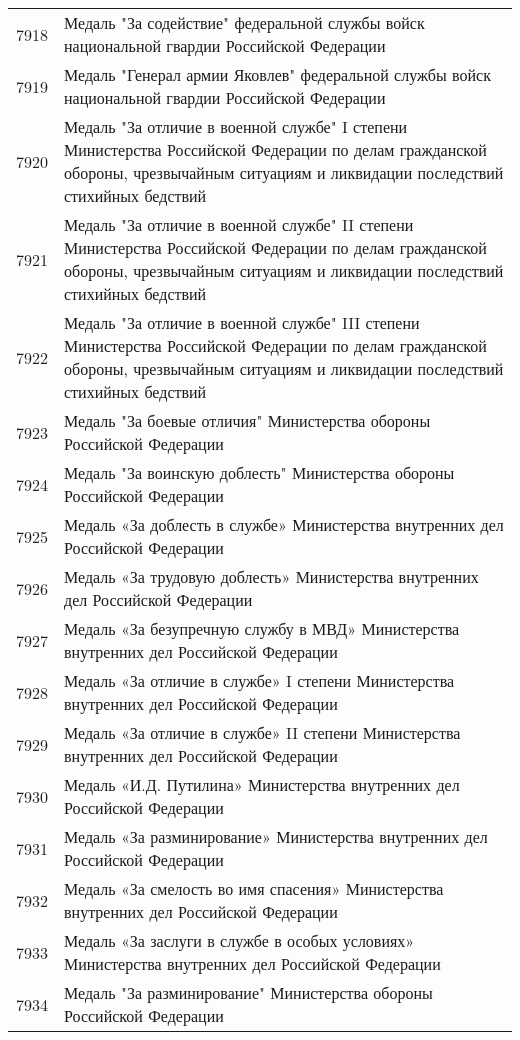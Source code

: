\documentclass[10pt, a4paper, titlepage]{article}
\begin{document}
\begin{center}
\begin{longtable}{rp{}}
        7918 & Медаль "За содействие" федеральной службы войск национальной гвардии Российской Федерации \\
        7919 & Медаль "Генерал армии Яковлев" федеральной службы войск национальной гвардии Российской Федерации \\
        7920 & Медаль "За отличие в военной службе" I степени Министерства Российской Федерации по делам гражданской обороны, чрезвычайным ситуациям и ликвидации последствий стихийных бедствий \\
        7921 & Медаль "За отличие в военной службе" II степени Министерства Российской Федерации по делам гражданской обороны, чрезвычайным ситуациям и ликвидации последствий стихийных бедствий \\
        7922 & Медаль "За отличие в военной службе" III степени Министерства Российской Федерации по делам гражданской обороны, чрезвычайным ситуациям и ликвидации последствий стихийных бедствий \\
        7923 & Медаль "За боевые отличия" Министерства обороны Российской Федерации \\
        7924 & Медаль "За воинскую доблесть" Министерства обороны Российской Федерации \\
        7925 & Медаль «За доблесть в службе» Министерства внутренних дел Российской Федерации \\
        7926 & Медаль «За трудовую доблесть» Министерства внутренних дел Российской Федерации \\
        7927 & Медаль «За безупречную службу в МВД» Министерства внутренних дел Российской Федерации \\
        7928 & Медаль «За отличие в службе» I степени Министерства внутренних дел Российской Федерации \\
        7929 & Медаль «За отличие в службе» II степени Министерства внутренних дел Российской Федерации \\
        7930 & Медаль «И.Д. Путилина» Министерства внутренних дел Российской Федерации \\
        7931 & Медаль «За разминирование» Министерства внутренних дел Российской Федерации \\
        7932 & Медаль «За смелость во имя спасения» Министерства внутренних дел Российской Федерации \\
        7933 & Медаль «За заслуги в службе в особых условиях» Министерства внутренних дел Российской Федерации \\
        7934 & Медаль "За разминирование" Министерства обороны Российской Федерации \\

\end{longtable}
\end{center}
\end{document}
